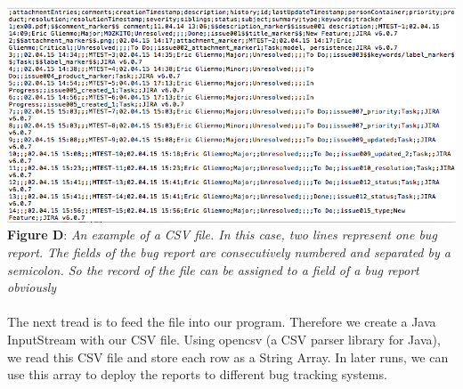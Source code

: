 \\ \\ \includegraphics[width=1.0\textwidth]{example-csv.png}  \\\textbf{Figure D}: \textit{An example of a CSV file. In this case, two lines represent one bug report. The fields of the bug report are consecutively numbered and separated by a semicolon. So the record of the file can be assigned to a field of a bug report obviously}  \\ \\ The next tread is to feed the file into our program. Therefore we create a Java InputStream with our CSV file. Using opencsv (a CSV parser library for Java),  we read this CSV file and store each row as a String Array. In later runs, we can use this array to deploy the reports to different bug tracking systems.
 


